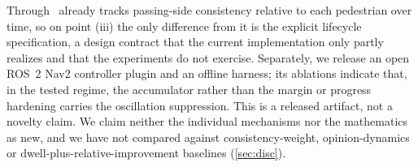 Through~\citep{mavrogiannis2023winding} already tracks passing-side consistency relative to each pedestrian over time, so on point (iii) the only difference from it is the explicit lifecycle specification, a design contract that the current implementation only partly realizes and that the experiments do not exercise. Separately, we release an open ROS~2 Nav2 controller plugin and an offline harness; its ablations indicate that, in the tested regime, the accumulator rather than the margin or progress hardening carries the oscillation suppression. This is a released artifact, not a novelty claim. We claim neither the individual mechanisms nor the mathematics as new, and we have not compared against consistency-weight, opinion-dynamics or dwell-plus-relative-improvement baselines (\cref{sec:disc}).
